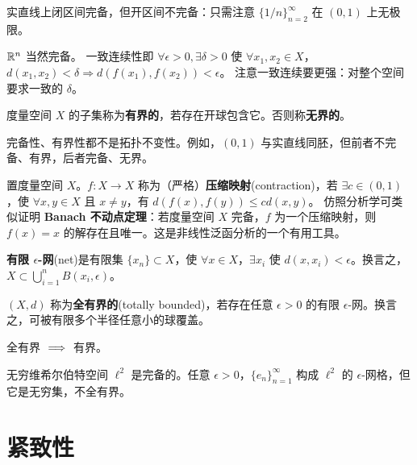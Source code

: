 %

实直线上闭区间完备，但开区间不完备：只需注意 $\{1/n\}_{n=2}^\infty$ 在 $(0,1)$ 上无极限。

$\mathbb{R}^{n}$ 当然完备。
一致连续性即 $\forall \epsilon>0,\exists\delta>0$ 
使 $\forall x_{1},x_{2} \in X$，$d(x_{1},x_{2})<\delta\Rightarrow d(f(x_{1}),f(x_{2}))<\epsilon$。
注意一致连续要更强：对整个空间要求一致的 $\delta$。

\begin{definition}
    度量空间 $X$ 的子集称为\textbf{有界的}，若存在开球包含它。否则称\textbf{无界的}。
\end{definition}

\begin{remark}
    完备性、有界性都不是拓扑不变性。例如，$(0,1)$ 与实直线同胚，但前者不完备、有界，后者完备、无界。
\end{remark}

置度量空间 $X$。$f: X \to X$ 称为（严格）\textbf{压缩映射}(contraction)，若 $\exists c\in(0,1)$，使 $\forall x,y \in X$ 且 $x\ne y$，有 $d(f(x),f(y)) \leqslant c d(x,y)$。
仿照分析学可类似证明 \textbf{Banach 不动点定理}：若度量空间 $X$ 完备，$f$ 为一个压缩映射，则 $f(x)=x$ 的解存在且唯一。这是非线性泛函分析的一个有用工具。


\begin{definition}
    \textbf{有限 $\epsilon$-网}(net)是有限集 $\{x_n\}\subset X$，使 $\forall x\in X$，$\exists x_i$ 使 $d(x,x_i)<\epsilon$。换言之，$X\subset\bigcup_{i=1}^n B(x_i,\epsilon)$。
\end{definition}

\begin{definition}
    $(X,d)$ 称为\textbf{全有界的}(totally bounded)，若存在任意 $\epsilon>0$ 的有限 $\epsilon$-网。换言之，可被有限多个半径任意小的球覆盖。
\end{definition}

\begin{remark}
    全有界 $\implies$ 有界。
\end{remark}

\begin{eg}
    无穷维希尔伯特空间 $\ell^2$ 是完备的。任意 $\epsilon>0$，$\{e_n\}_{n=1}^\infty$ 构成 $\ell^2$ 的 $\epsilon$-网格，但它是无穷集，不全有界。
\end{eg}


\section{紧致性}

